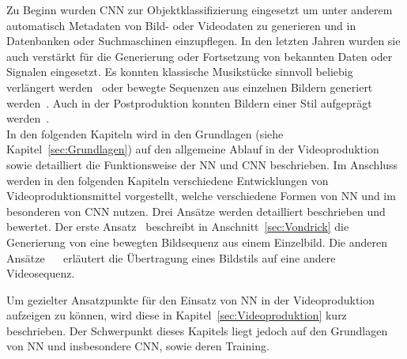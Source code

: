 \documentclass[times, 11pt,twocolumn]{article}
\begin{document}
Zu Beginn wurden CNN zur Objektklassifizierung eingesetzt um unter anderem automatisch Metadaten von Bild- oder Videodaten zu generieren und in Datenbanken oder Suchmaschinen einzupflegen. In den letzten Jahren wurden sie auch verstärkt für die Generierung oder Fortsetzung von bekannten Daten oder Signalen eingesetzt. Es konnten klassische Musikstücke sinnvoll beliebig verlängert werden~\cite{OordDZSVGKSK16} oder bewegte Sequenzen aus einzelnen Bildern generiert werden~\cite{VondrickPT16}. Auch in der Postproduktion konnten Bildern einer Stil aufgeprägt werden~\cite{DeepDream}. \\

In den folgenden Kapiteln wird in den Grundlagen (siehe Kapitel~\ref{sec:Grundlagen}) auf den allgemeine Ablauf in der Videoproduktion sowie detailliert die Funktionsweise der NN und CNN beschrieben. Im Anschluss werden in den folgenden Kapiteln verschiedene Entwicklungen von Videoproduktionsmittel vorgestellt, welche verschiedene Formen von NN und im besonderen von CNN nutzen. Drei Ansätze werden detailliert beschrieben und bewertet. Der erste Ansatz~\cite{VondrickPT16} beschreibt in Anschnitt~\ref{sec:Vondrick} die Generierung von eine bewegten Bildsequenz aus einem Einzelbild. Die anderen Ansätze~ \cite{DeepDream}~\cite{GatysEB15a} erläutert die Übertragung eines Bildstils auf eine andere Videosequenz.


 \label{sec:Grundlagen}
Um gezielter Ansatzpunkte für den Einsatz von NN in der Videoproduktion aufzeigen zu können, wird diese in Kapitel~\ref{sec:Videoproduktion} kurz beschrieben. Der Schwerpunkt dieses Kapitels liegt jedoch auf den Grundlagen von NN und insbesondere CNN, sowie deren Training.
\end{document}
